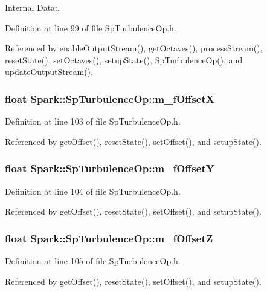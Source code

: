 Internal Data:. 

Definition at line 99 of file Sp\-Turbulence\-Op.h.

Referenced by enable\-Output\-Stream(), get\-Octaves(), process\-Stream(), reset\-State(), set\-Octaves(), setup\-State(), Sp\-Turbulence\-Op(), and update\-Output\-Stream().
\subsubsection{\setlength{\rightskip}{0pt plus 5cm}float {\bf Spark::Sp\-Turbulence\-Op::m\_\-f\-Offset\-X}\hspace{0.3cm}{\tt  [protected]}}\label{classSpark_1_1SpTurbulenceOp_p3}


Definition at line 103 of file Sp\-Turbulence\-Op.h.

Referenced by get\-Offset(), reset\-State(), set\-Offset(), and setup\-State().
\subsubsection{\setlength{\rightskip}{0pt plus 5cm}float {\bf Spark::Sp\-Turbulence\-Op::m\_\-f\-Offset\-Y}\hspace{0.3cm}{\tt  [protected]}}\label{classSpark_1_1SpTurbulenceOp_p4}


Definition at line 104 of file Sp\-Turbulence\-Op.h.

Referenced by get\-Offset(), reset\-State(), set\-Offset(), and setup\-State().
\subsubsection{\setlength{\rightskip}{0pt plus 5cm}float {\bf Spark::Sp\-Turbulence\-Op::m\_\-f\-Offset\-Z}\hspace{0.3cm}{\tt  [protected]}}\label{classSpark_1_1SpTurbulenceOp_p5}


Definition at line 105 of file Sp\-Turbulence\-Op.h.

Referenced by get\-Offset(), reset\-State(), set\-Offset(), and setup\-State().

